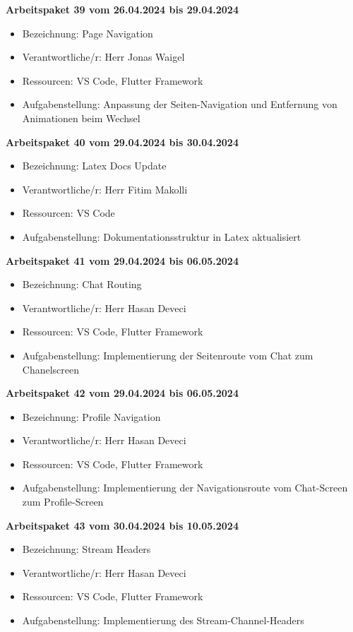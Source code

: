 \textbf{Arbeitspaket 39 vom 26.04.2024 bis 29.04.2024}
\begin{itemize}[itemsep=0pt]
    \item{Bezeichnung: Page Navigation} 
	\item{Verantwortliche/r: Herr Jonas Waigel} 
	\item{Ressourcen: VS Code, Flutter Framework} 
    \item{Aufgabenstellung: Anpassung der Seiten-Navigation und Entfernung von Animationen beim Wechsel}
\end{itemize}

\textbf{Arbeitspaket 40 vom 29.04.2024 bis 30.04.2024}
\begin{itemize}[itemsep=0pt]
    \item{Bezeichnung: Latex Docs Update} 
	\item{Verantwortliche/r: Herr Fitim Makolli} 
	\item{Ressourcen: VS Code} 
    \item{Aufgabenstellung: Dokumentationsstruktur in Latex aktualisiert}
\end{itemize} 

\textbf{Arbeitspaket 41 vom 29.04.2024 bis 06.05.2024}
\begin{itemize}[itemsep=0pt]
    \item{Bezeichnung: Chat Routing} 
	\item{Verantwortliche/r: Herr Hasan Deveci} 
	\item{Ressourcen: VS Code, Flutter Framework} 
    \item{Aufgabenstellung: Implementierung der Seitenroute vom Chat zum Chanelscreen}
\end{itemize} 

\textbf{Arbeitspaket 42 vom 29.04.2024 bis 06.05.2024}
\begin{itemize}[itemsep=0pt]
    \item{Bezeichnung: Profile Navigation} 
	\item{Verantwortliche/r: Herr Hasan Deveci} 
	\item{Ressourcen: VS Code, Flutter Framework} 
    \item{Aufgabenstellung: Implementierung der Navigationsroute vom Chat-Screen zum Profile-Screen}
\end{itemize} 

\textbf{Arbeitspaket 43 vom 30.04.2024 bis 10.05.2024}
\begin{itemize}[itemsep=0pt]
    \item{Bezeichnung: Stream Headers} 
	\item{Verantwortliche/r: Herr Hasan Deveci} 
	\item{Ressourcen: VS Code, Flutter Framework} 
    \item{Aufgabenstellung: Implementierung des Stream-Channel-Headers}
\end{itemize} 

